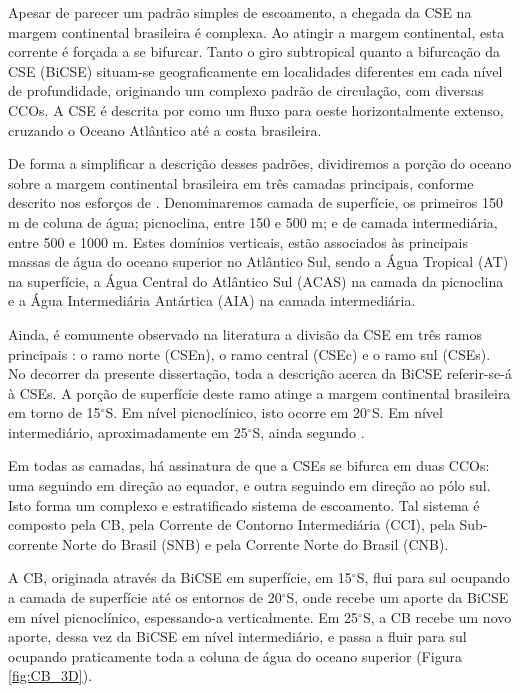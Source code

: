 Apesar de parecer um padrão simples
de escoamento, a chegada da CSE na margem continental brasileira é complexa. Ao atingir a margem continental, 
esta corrente é forçada a se bifurcar. Tanto o giro subtropical quanto a bifurcação
da CSE (BiCSE) situam-se geograficamente em localidades diferentes em cada nível de profundidade, originando 
um complexo padrão de circulação, com diversas CCOs. A CSE é descrita por \cite{wienders_etal2000} como um fluxo 
para oeste horizontalmente extenso, cruzando o Oceano Atlântico até a costa brasileira. 

De forma a simplificar a descrição desses padrões, dividiremos a porção do oceano sobre a margem continental
brasileira em três camadas principais, 
conforme descrito nos esforços de \cite{stramma_england1999}. Denominaremos camada de  
superfície, os primeiros 150 m de coluna de água; picnoclina, entre 150 e 500 m;
e de camada intermediária, entre 500 e 1000 m. Estes domínios verticais, estão associados 
às principais massas de água do oceano superior no Atlântico
Sul, sendo a Água Tropical (AT) na superfície, a Água Central do Atlântico Sul (ACAS) na camada da
picnoclina e a Água Intermediária Antártica (AIA) na camada intermediária.  

Ainda, é comumente observado na literatura a divisão da CSE em três ramos principais \citep{stramma1991}:
o ramo norte (CSEn), o ramo central (CSEc) e o ramo sul (CSEs). No decorrer da presente dissertação, toda a descrição acerca
da BiCSE referir-se-á à CSEs. A porção de superfície deste ramo atinge a margem continental 
brasileira em torno de 15$^\circ$S. Em nível picnoclínico, isto ocorre em 20$^\circ$S.
Em nível intermediário, aproximadamente em 25$^\circ$S, ainda segundo \cite{stramma_england1999}.

Em todas as camadas, há assinatura de que a CSEs se bifurca em duas CCOs: 
uma seguindo em direção ao equador, e outra seguindo em direção ao pólo sul. Isto 
forma um complexo e estratificado sistema de escoamento. Tal sistema é composto
pela CB, pela Corrente de Contorno Intermediária (CCI), pela Sub-corrente Norte
do Brasil (SNB) e pela Corrente Norte do Brasil (CNB).

A CB, originada através da BiCSE em superfície, em 15$^\circ$S, flui para sul ocupando a camada de superfície
até os entornos de 20$^\circ$S, onde recebe um aporte da BiCSE em nível picnoclínico,
espessando-a verticalmente. Em 25$^\circ$S, a CB recebe um novo aporte, dessa vez da
BiCSE em nível intermediário, e passa a fluir para sul ocupando praticamente toda a 
coluna de água do oceano superior (Figura \ref{fig:CB_3D}). 

